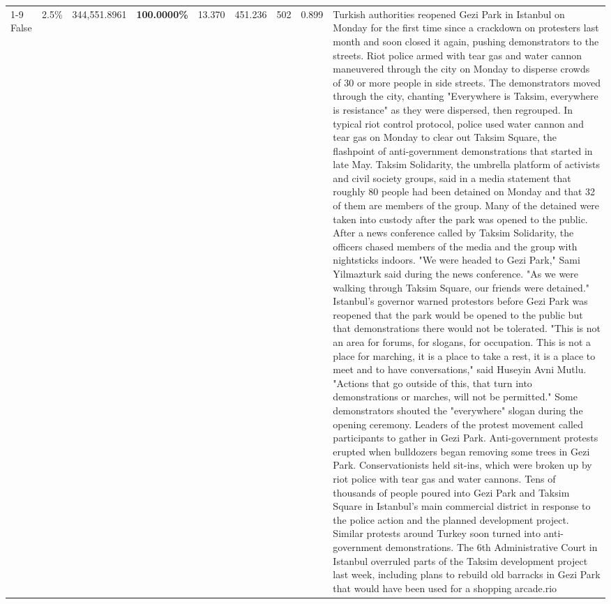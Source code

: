 \begin{table}[H]
\begin{tabular}{lllrlllll}
\cline{1-9}
False & 2.5\% & 344,551.8961 & \bfseries \color{red} 100.0000\% & 13.370 & 451.236 & 502 & 0.899 & Turkish authorities reopened Gezi Park in Istanbul on Monday for the first time since a crackdown on protesters last month and soon closed it again, pushing demonstrators to the streets. Riot police armed with tear gas and water cannon maneuvered through the city on Monday to disperse crowds of 30 or more people in side streets. The demonstrators moved through the city, chanting "Everywhere is Taksim, everywhere is resistance" as they were dispersed, then regrouped. In typical riot control protocol, police used water cannon and tear gas on Monday to clear out Taksim Square, the flashpoint of anti-government demonstrations that started in late May. Taksim Solidarity, the umbrella platform of activists and civil society groups, said in a media statement that roughly 80 people had been detained on Monday and that 32 of them are members of the group. Many of the detained were taken into custody after the park was opened to the public. After a news conference called by Taksim Solidarity, the officers chased members of the media and the group with nightsticks indoors. "We were headed to Gezi Park," Sami Yilmazturk said during the news conference. "As we were walking through Taksim Square, our friends were detained." Istanbul's governor warned protestors before Gezi Park was reopened that the park would be opened to the public but that demonstrations there would not be tolerated. "This is not an area for forums, for slogans, for occupation. This is not a place for marching, it is a place to take a rest, it is a place to meet and to have conversations," said Huseyin Avni Mutlu. "Actions that go outside of this, that turn into demonstrations or marches, will not be permitted." Some demonstrators shouted the "everywhere" slogan during the opening ceremony. Leaders of the protest movement called participants to gather in Gezi Park. Anti-government protests erupted when bulldozers began removing some trees in Gezi Park. Conservationists held sit-ins, which were broken up by riot police with tear gas and water cannons. Tens of thousands of people poured into Gezi Park and Taksim Square in Istanbul's main commercial district in response to the police action and the planned development project. Similar protests around Turkey soon turned into anti-government demonstrations. The 6th Administrative Court in Istanbul overruled parts of the Taksim development project last week, including plans to rebuild old barracks in Gezi Park that would have been used for a shopping arcade.rio \\

\end{tabular}
\end{table}
